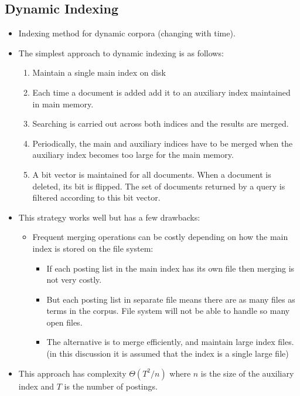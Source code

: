 \documentclass{article}
\begin{document}
\subsection{Dynamic Indexing}
\begin{itemize}
    \item Indexing method for dynamic corpora (changing with time). 
    
    \item The simplest approach to dynamic indexing is as follows:
    \begin{enumerate}
        \item Maintain a single main index on disk
        
        \item Each time a document is added add it to an auxiliary index maintained in main memory. 
        
        \item Searching is carried out across both indices and the results are merged. 
        
        \item Periodically, the main and auxiliary indices have to be merged when the auxiliary index becomes too large for the main memory.
        
        \item A bit vector is maintained for all documents. When a document is deleted, its bit is flipped. The set of documents returned by a query is filtered according to this bit vector. 
        
    \end{enumerate}
    
    \item This strategy works well but has a few drawbacks:
    \begin{itemize}
        \item Frequent merging operations can be costly depending on how the main index is stored on the file system:
        \begin{itemize}
            \item If each posting list in the main index has its own file then merging is not very costly. 
            
            \item But each posting list in separate file means there are as many files as terms in the corpus. File system will not be able to handle so many open files.
            
            \item The alternative is to merge efficiently, and maintain large index files. (in this discussion it is assumed that the index is a single large file)
        \end{itemize}
    \end{itemize}
    
    \item This approach has complexity $\Theta (T^2/n)$ where $n$ is the size of the auxiliary index and $T$ is the number of postings. 
\end{itemize}
\end{document}
